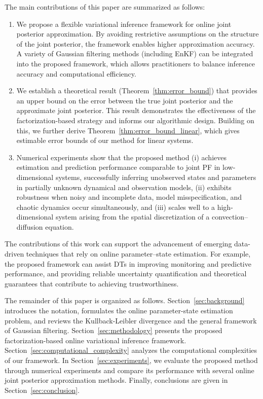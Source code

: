\documentclass[preprint,3p,times]{elsarticle}
\begin{document}
The main contributions of this paper are summarized as follows:
\begin{enumerate}
\item We propose a flexible variational inference framework for online joint posterior approximation. By avoiding restrictive assumptions on the structure of the joint posterior, the framework enables higher approximation accuracy. A variety of Gaussian filtering methods (including EnKF) can be integrated into the proposed framework, which allows practitioners to balance inference accuracy and computational efficiency.
\item We establish a theoretical result (Theorem~\ref{thm:error_bound}) that provides an upper bound on the error between the true joint posterior and the approximate joint posterior. This result demonstrates the effectiveness of the factorization-based strategy and informs our algorithmic design. Building on this, we further derive Theorem~\ref{thm:error_bound_linear}, which gives estimable error bounds of our method for linear systems.
\item Numerical experiments show that the proposed method (i) achieves estimation and prediction performance comparable to joint PF in low-dimensional systems, successfully inferring unobserved states and parameters in partially unknown dynamical and observation models, (ii) exhibits robustness when noisy and incomplete data, model misspecification, and chaotic dynamics occur simultaneously, and (iii) scales well to a high-dimensional system arising from the spatial discretization of a convection--diffusion equation.
\end{enumerate}

The contributions of this work can support the advancement of emerging data-driven techniques that rely on online parameter–state estimation. For example, the proposed framework can assist DTs in improving monitoring and predictive performance, and providing reliable uncertainty quantification and theoretical guarantees that contribute to achieving trustworthiness.

The remainder of this paper is organized as follows. Section~\ref{sec:background} introduces the notation, formulates the online parameter-state estimation problem, and reviews the Kullback-Leibler divergence and the general framework of Gaussian filtering. Section~\ref{sec:methodology} presents the proposed factorization-based online variational inference framework. Section~\ref{sec:computational_complexity} analyzes the computational complexities of our framework. In Section~\ref{sec:experiments}, we evaluate the proposed method through numerical experiments and compare its performance with several online joint posterior approximation methods.  Finally, conclusions are given in Section~\ref{sec:conclusion}. 
\end{document}
